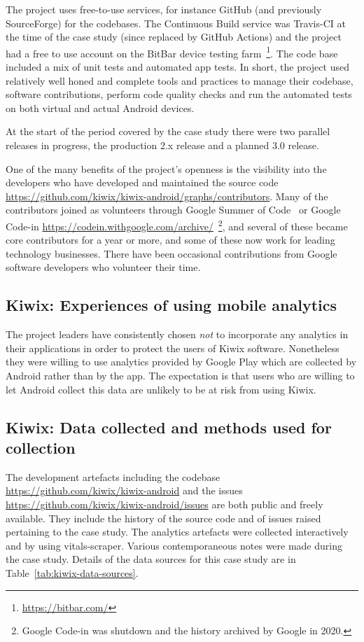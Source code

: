 The project uses free-to-use services, for instance GitHub (and previously SourceForge) for the codebases. The Continuous Build service was Travis-CI at the time of the case study (since replaced by GitHub Actions) and the project had a free to use account on the BitBar device testing farm~\footnote{\url{https://bitbar.com/}}. The code base included a mix of unit tests and automated app tests. In short, the project used relatively well honed and complete tools and practices to manage their codebase, software contributions, perform code quality checks and run the automated tests on both virtual and actual Android devices.

At the start of the period covered by the case study there were two parallel releases in progress, the production 2.x release and a planned 3.0 release.

One of the many benefits of the project’s openness is the visibility into the developers who have developed and maintained the source code \url{https://github.com/kiwix/kiwix-android/graphs/contributors}. Many of the contributors joined as volunteers through Google Summer of Code~\citep{google_summer_of_code} or Google Code-in \url{https://codein.withgoogle.com/archive/}~\footnote{Google Code-in was shutdown and the history archived by Google in 2020.}, and several of these became core contributors for a year or more, and some of these now work for leading technology businesses. There have been occasional contributions from Google software developers who volunteer their time.

\subsection{Kiwix: Experiences of using mobile analytics}
The project leaders have consistently chosen \emph{not} to incorporate any analytics in their applications in order to protect the users of Kiwix software. Nonetheless they were willing to use analytics provided by Google Play which are collected by Android rather than by the app. The expectation is that users who are willing to let Android collect this data are unlikely to be at risk from using Kiwix.

\subsection{Kiwix: Data collected and methods used for collection}
The development artefacts including the codebase \url{https://github.com/kiwix/kiwix-android} and the issues \url{https://github.com/kiwix/kiwix-android/issues} are both public and freely available. They include the history of the source code and of issues raised pertaining to the case study. The analytics artefacts were collected interactively and by using vitals-scraper. Various contemporaneous notes were made during the case study.  Details of the data sources for this case study are in Table~\ref{tab:kiwix-data-sources}.

